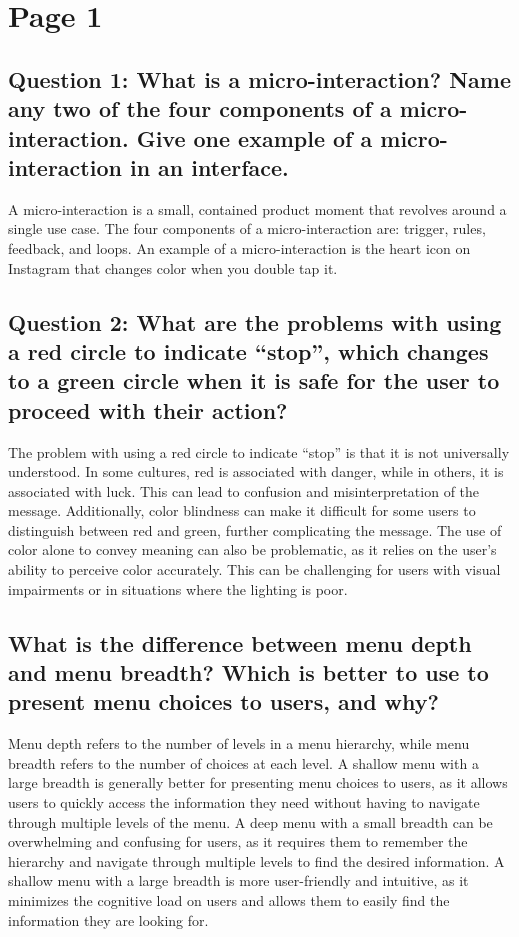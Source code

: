 \documentclass{article}
\begin{document}
\section{Page 1}

\subsection{Question 1:
    What is a micro-interaction? Name any two of the four components of a
    micro-interaction.
    Give one example of a micro-interaction in an interface.}

A micro-interaction is a small, contained product moment that revolves around a single use case.
The four components of a micro-interaction are: trigger, rules, feedback, and loops.
An example of a micro-interaction is the heart icon on Instagram that changes color when you double tap it.

\subsection{Question 2:
    What are the problems with using a red circle to indicate “stop”, which
    changes to a green circle when it is safe for the user to proceed with their
    action?}

The problem with using a red circle to indicate “stop” is that it is not universally understood.
In some cultures, red is associated with danger, while in others, it is associated with luck.
This can lead to confusion and misinterpretation of the message.
Additionally, color blindness can make it difficult for some users to distinguish between red and green, further complicating the message.
The use of color alone to convey meaning can also be problematic, as it relies on the user’s ability to perceive color accurately.
This can be challenging for users with visual impairments or in situations where the lighting is poor.

\subsection{What is the difference between menu depth and menu breadth? Which is
    better to use to present menu choices to users, and why?}

Menu depth refers to the number of levels in a menu hierarchy, while menu breadth refers to the number of choices at each level.
A shallow menu with a large breadth is generally better for presenting menu choices to users, as it allows users to quickly access the information they need without having to navigate through multiple levels of the menu.
A deep menu with a small breadth can be overwhelming and confusing for users, as it requires them to remember the hierarchy and navigate through multiple levels to find the desired information.
A shallow menu with a large breadth is more user-friendly and intuitive, as it minimizes the cognitive load on users and allows them to easily find the information they are looking for.
\end{document}
